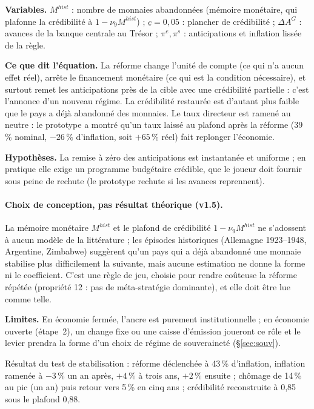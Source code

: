 \documentclass[11pt,a4paper]{article}
\newcommand{\variables}{\par\noindent\textbf{Variables.} }
\newcommand{\sens}{\par\noindent\textbf{Ce que dit l'équation.} }
\newcommand{\hyp}{\par\noindent\textbf{Hypothèses.} }
\newcommand{\limites}{\par\noindent\textbf{Limites.} }
\begin{document}
\begin{lecture}
\variables $M^{hist}$ : nombre de monnaies abandonnées (mémoire monétaire, qui plafonne la crédibilité à $1-\nu_9M^{hist}$) ; $\underline c=0{,}05$ : plancher de crédibilité ; $\Delta A^G$ : avances de la banque centrale au Trésor ; $\pi^e,\pi^s$ : anticipations et inflation lissée de la règle.
\sens La réforme change l'unité de compte (ce qui n'a aucun effet réel), arrête le financement monétaire (ce qui est la condition nécessaire), et surtout remet les anticipations près de la cible avec une crédibilité partielle : c'est l'annonce d'un nouveau régime. La crédibilité restaurée est d'autant plus faible que le pays a déjà abandonné des monnaies. Le taux directeur est ramené au neutre : le prototype a montré qu'un taux laissé au plafond après la réforme (39\,\% nominal, $-26\,\%$ d'inflation, soit $+65\,\%$ réel) fait replonger l'économie.
\hyp La remise à zéro des anticipations est instantanée et uniforme ; en pratique elle exige un programme budgétaire crédible, que le joueur doit fournir sous peine de rechute (le prototype rechute si les avances reprennent).
\paragraph{Choix de conception, pas résultat théorique (v1.5).} La mémoire monétaire $M^{hist}$ et le plafond de crédibilité $1-\nu_9M^{hist}$ ne s'adossent à aucun modèle de la littérature ; les épisodes historiques (Allemagne 1923--1948, Argentine, Zimbabwe) suggèrent qu'un pays qui a déjà abandonné une monnaie stabilise plus difficilement la suivante, mais aucune estimation ne donne la forme ni le coefficient. C'est une règle de jeu, choisie pour rendre coûteuse la réforme répétée (propriété 12 : pas de méta-stratégie dominante), et elle doit être lue comme telle.
\limites En économie fermée, l'ancre est purement institutionnelle ; en économie ouverte (étape~2), un change fixe ou une caisse d'émission joueront ce rôle et le levier prendra la forme d'un choix de régime de souveraineté (\S\ref{sec:souv}).
\end{lecture}
Résultat du test de stabilisation : réforme déclenchée à 43\,\% d'inflation, inflation ramenée à $-3\,\%$ un an après, $+4\,\%$ à trois ans, $+2\,\%$ ensuite ; chômage de 14\,\% au pic (un an) puis retour vers 5\,\% en cinq ans ; crédibilité reconstruite à 0,85 sous le plafond 0,88.
\end{document}
